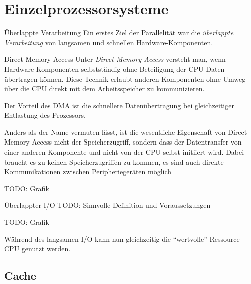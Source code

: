\section{Einzelprozessorsysteme}\label{sec:einzelprozessorsysteme}

\begin{defi}{Überlappte Verarbeitung}
    Ein erstes Ziel der Parallelität war die \emph{überlappte Verarbeitung} von langsamen und schnellen Hardware-Komponenten.
\end{defi}

\begin{example}{Direct Memory Access}
    Unter \emph{Direct Memory Access} versteht man, wenn Hardware-Komponenten selbstständig ohne Beteiligung der CPU Daten übertragen können.
    Diese Technik erlaubt anderen Komponenten ohne Umweg über die CPU direkt mit dem Arbeitsspeicher zu kommunizieren.
    
    Der Vorteil des DMA ist die schnellere Datenübertragung bei gleichzeitiger Entlastung des Prozessors.
    
    Anders als der Name vermuten lässt, ist die wesentliche Eigenschaft von Direct Memory Access nicht der Speicherzugriff, sondern dass der Datentransfer von einer anderen Komponente und nicht von der CPU selbst initiiert wird. Dabei braucht es zu keinen Speicherzugriffen zu kommen, es sind auch direkte Kommunikationen zwischen Peripheriegeräten möglich
    
    TODO: Grafik
\end{example}

\begin{defi}{Überlappter I/O}
    TODO: Sinnvolle Definition und Voraussetzungen
    
    TODO: Grafik
    
    Während des langsamen I/O kann nun gleichzeitig die \enquote{wertvolle} Ressource CPU genutzt werden.
\end{defi}

\subsection{Cache}\label{subsec:cache}

